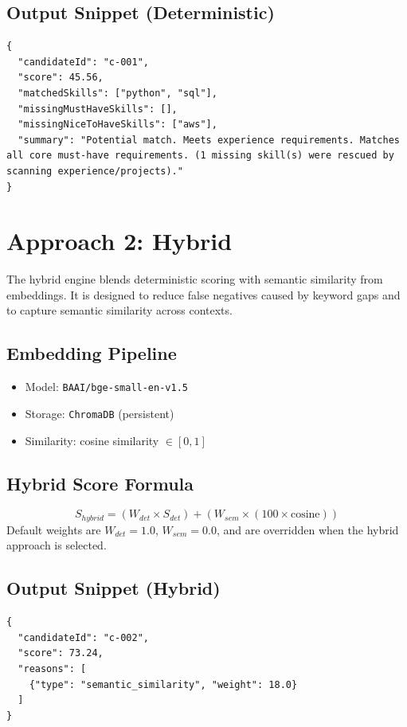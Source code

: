 \documentclass[12pt,a4paper]{article}
\begin{document}
\subsection{Output Snippet (Deterministic)}
\begin{lstlisting}
{
  "candidateId": "c-001",
  "score": 45.56,
  "matchedSkills": ["python", "sql"],
  "missingMustHaveSkills": [],
  "missingNiceToHaveSkills": ["aws"],
  "summary": "Potential match. Meets experience requirements. Matches all core must-have requirements. (1 missing skill(s) were rescued by scanning experience/projects)."
}
\end{lstlisting}

\section{Approach 2: Hybrid}
The hybrid engine blends deterministic scoring with semantic similarity from embeddings. It is designed to reduce false negatives caused by keyword gaps and to capture semantic similarity across contexts.

\subsection{Embedding Pipeline}
\begin{itemize}
    \item Model: \texttt{BAAI/bge-small-en-v1.5}
    \item Storage: \texttt{ChromaDB} (persistent)
    \item Similarity: cosine similarity $\in [0, 1]$
\end{itemize}

\subsection{Hybrid Score Formula}
\[
S_{hybrid} = (W_{det} \times S_{det}) + (W_{sem} \times (100 \times \text{cosine}))
\]
Default weights are $W_{det}=1.0$, $W_{sem}=0.0$, and are overridden when the hybrid approach is selected.

\subsection{Output Snippet (Hybrid)}
\begin{lstlisting}
{
  "candidateId": "c-002",
  "score": 73.24,
  "reasons": [
    {"type": "semantic_similarity", "weight": 18.0}
  ]
}
\end{lstlisting}
\end{document}
